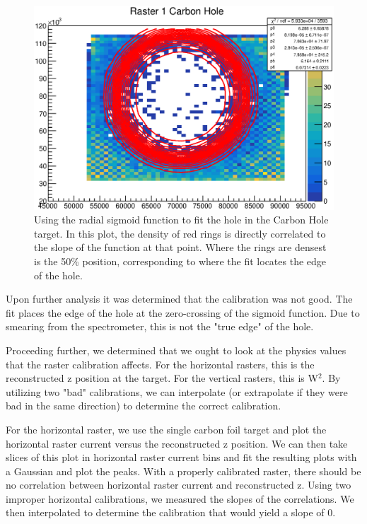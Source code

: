 \begin{figure}
	\includegraphics[width=\textwidth]{./analysis/fig/final_chole_fit.eps}
	\caption{Using the radial sigmoid function to fit the hole in the Carbon Hole target. In this plot, the density of red rings is directly correlated to the slope of the function at that point. Where the rings are densest is the 50\% position, corresponding to where the fit locates the edge of the hole.}
	\label{fig:carbholefit}
\end{figure}

Upon further analysis it was determined that the calibration was not good. The fit places the edge of the hole at the zero-crossing of the sigmoid function. Due to smearing from the spectrometer, this is not the "true edge" of the hole.

Proceeding further, we determined that we ought to look at the physics values that the raster calibration affects. For the horizontal rasters, this is the reconstructed z position at the target. For the vertical rasters, this is W$^2$. By utilizing two "bad" calibrations, we can interpolate (or extrapolate if they were bad in the same direction) to determine the correct calibration.

For the horizontal raster, we use the single carbon foil target and plot the horizontal raster current versus the reconstructed z position. We can then take slices of this plot in horizontal raster current bins and fit the resulting plots with a Gaussian and plot the peaks. With a properly calibrated raster, there should be no correlation between horizontal raster current and reconstructed z. Using two improper horizontal calibrations, we measured the slopes of the correlations. We then interpolated to determine the calibration that would yield a slope of 0.

